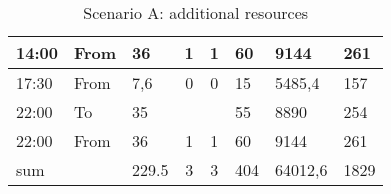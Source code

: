 \begin{table}[h]
\begin{tabular}{|ll|l|c|c|l|l|l|}
\multicolumn{1}{|l|}{14:00}          & From                                                                                & 36                               & \multirow{-2}{*}{1}      & \multirow{-2}{*}{1}      & 60                                                                                      & 9144                                  & 261                                  \\ \hline
\multicolumn{1}{|l|}{17:30}          & From                                                                                & 7,6                              & 0                        & 0                        & 15                                                                                      & 5485,4                                & 157                                  \\ \hline
\multicolumn{1}{|l|}{22:00}          & To                                                                                  & 35                               &                          &                          & 55                                                                                      & 8890                                  & 254                                  \\ \cline{1-3} \cline{6-8} 
\multicolumn{1}{|l|}{22:00}          & From                                                                                & 36                               & \multirow{-2}{*}{1}      & \multirow{-2}{*}{1}      & 60                                                                                      & 9144                                  & 261                                  \\ \hline
\multicolumn{2}{|l|}{sum}                                                                                                  & 229.5                            & 3 & 3 & 404                                                                                     & 64012,6                               & 1829                                 \\ \hline
\end{tabular}
\caption{Scenario A: additional resources}
\label{tab:addresA}
\end{table}
